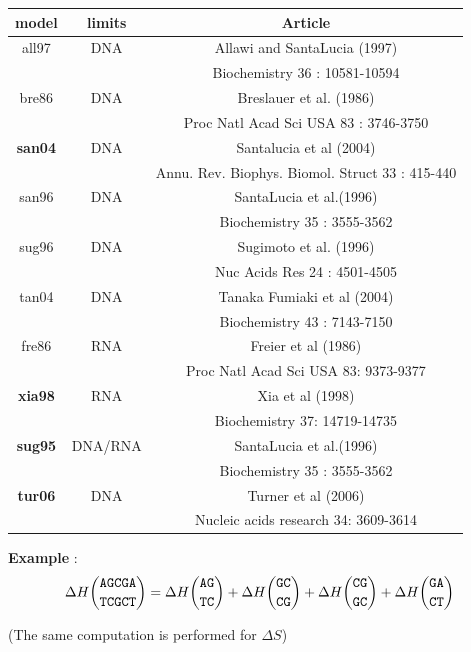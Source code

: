 \documentclass{article}
\begin{document}
\begin{table}[h][c]
\begin{tabular}[h]{| c | c | c |}
\textbf{model} & \textbf{limits} & \textbf{Article} \\ 
\hline
all97 & DNA & Allawi and SantaLucia (1997) \\
 & & Biochemistry 36 : 10581-10594 \\
 \hline
bre86 & DNA & Breslauer et al. (1986) \\
 & & Proc Natl Acad Sci USA 83 : 3746-3750 \\
 \hline
\textbf{san04} & DNA & Santalucia et al (2004) \\
 & & Annu. Rev. Biophys. Biomol. Struct 33 : 415-440 \\
 \hline
san96 & DNA & SantaLucia et al.(1996) \\
 & & Biochemistry 35 : 3555-3562 \\
 \hline
sug96 & DNA & Sugimoto et al. (1996)\\
 & & Nuc Acids Res 24 : 4501-4505 \\
 \hline
tan04 & DNA & Tanaka Fumiaki et al (2004)\\
 & & Biochemistry 43 : 7143-7150  \\
 \hline
fre86 & RNA & Freier et al (1986) \\
 & & Proc Natl Acad Sci USA 83: 9373-9377 \\
 \hline
\textbf{xia98} & RNA & Xia et al (1998) \\
 & & Biochemistry 37: 14719-14735 \\
 \hline
\textbf{sug95} & DNA/RNA & SantaLucia et al.(1996) \\
 & & Biochemistry 35 : 3555-3562 \\
 \hline
\textbf{tur06} & DNA & Turner et al (2006) \\
 & & Nucleic acids research 34: 3609-3614 \\
 \hline
\end{tabular}
\end{table}


\textbf{Example} :
\begin{multline*}
\Delta H {\mbox{\texttt{AGCGA}} \choose \mbox{\texttt{TCGCT}}} = 
\Delta H {\mbox{\texttt{AG}} \choose \mbox{\texttt{TC}} } + 
\Delta H {\mbox{\texttt{GC}} \choose \mbox{\texttt{CG}} } +
\Delta H {\mbox{\texttt{CG}} \choose \mbox{\texttt{GC}} } +
\Delta H {\mbox{\texttt{GA}} \choose \mbox{\texttt{CT}} }
\end{multline*}

       (The same computation is performed for $\Delta S$)
       
\end{document}
